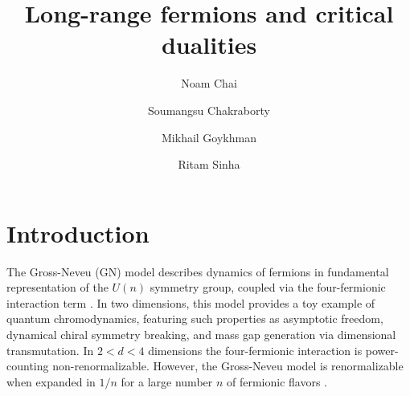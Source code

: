 \documentclass[aps,amsmath,amssymb,prd,showpacs,floatfix,preprint,superscriptaddress,nofootinbib,12pt]{article}
\begin{document}
\title{Long-range fermions and critical dualities}


\author[a]{Noam Chai}
\author[b]{Soumangsu Chakraborty}
\author[c]{Mikhail Goykhman}
\author[a]{Ritam Sinha}




\maketitle

\section{Introduction}
\label{sec:intro}

The Gross-Neveu (GN) model describes dynamics of fermions in fundamental
representation of the $U(n)$ symmetry group, coupled via the four-fermionic
interaction term \cite{Gross:1974jv}. In two dimensions, this model
provides a toy example of quantum chromodynamics, featuring
such properties as asymptotic freedom, dynamical chiral symmetry breaking, and mass gap generation via dimensional
transmutation. In $2<d<4$ dimensions
the four-fermionic interaction is power-counting non-renormalizable.
However, the Gross-Neveu model is renormalizable when expanded in $1/n$
for a large number $n$ of fermionic flavors \cite{Gross:1974jv,Zinn-Justin:1991ksq}. 
\end{document}
